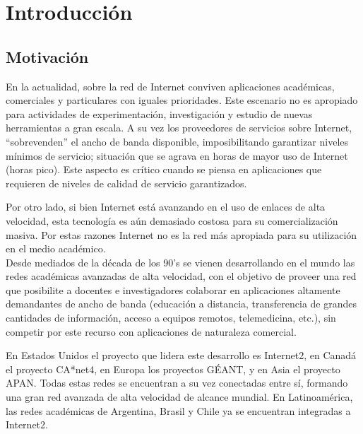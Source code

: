
\chapter{Introducci\'on}

\ifpdf
    \graphicspath{{Chapter1/Figs/Raster/}{Chapter1/Figs/PDF/}{Chapter2/Figs/}}
\else
    \graphicspath{{Chapter1/Figs/Vector/}{Chapter1/Figs/}}
\fi


\section{Motivación}

En la actualidad, sobre la red de Internet conviven aplicaciones académicas, comerciales y particulares con iguales prioridades. Este escenario no es apropiado para actividades de experimentación, investigación y estudio de nuevas herramientas a gran escala. A su vez los proveedores de servicios sobre Internet, “sobrevenden” el ancho de banda disponible, imposibilitando garantizar niveles mínimos de servicio; situación que se agrava en horas de mayor uso de Internet (horas pico). Este aspecto es crítico cuando se piensa en aplicaciones que requieren de niveles de calidad de servicio garantizados.

Por otro lado, si bien Internet está avanzando en el uso de enlaces de alta velocidad, esta tecnología es aún demasiado costosa para su comercialización masiva.
Por estas razones Internet no es la red más apropiada para su utilización en el medio académico.\\ 

Desde mediados de la década de los 90’s se vienen desarrollando en el mundo las redes académicas avanzadas de alta velocidad, con el objetivo de proveer una red que posibilite a docentes e investigadores colaborar en aplicaciones altamente demandantes de ancho de banda (educación a distancia, transferencia de grandes cantidades de información, acceso a equipos remotos, telemedicina, etc.), sin competir por este recurso con aplicaciones de naturaleza comercial.

En Estados Unidos el proyecto que lidera este desarrollo es Internet2, en Canadá el proyecto CA*net4, en Europa los proyectos GÉANT, y en Asia el proyecto APAN. Todas estas redes se encuentran a su vez conectadas entre sí, formando una gran red avanzada de alta velocidad de alcance mundial. En Latinoamérica, las redes académicas de Argentina, Brasil y Chile ya se encuentran integradas a Internet2.\\

